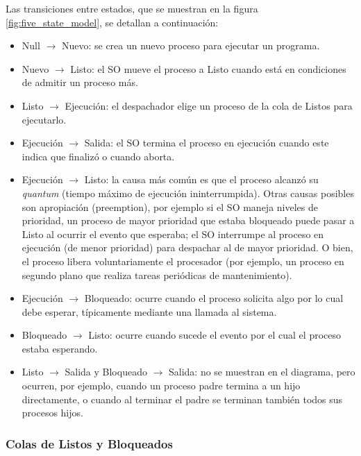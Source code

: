 Las transiciones entre estados, que se muestran en la figura \ref{fig:five_state_model}, se detallan a continuación:
\begin{itemize}
  \item Null \(\to\) Nuevo: se crea un nuevo proceso para ejecutar un programa.

  \item Nuevo \(\to\) Listo: el SO mueve el proceso a Listo cuando está en condiciones de admitir un proceso más.

  \item Listo \(\to\) Ejecución: el despachador elige un proceso de la cola de Listos para ejecutarlo.

  \item Ejecución \(\to\) Salida: el SO termina el proceso en ejecución cuando este indica que finalizó o cuando aborta.

  \item Ejecución \(\to\) Listo: la causa más común es que el proceso alcanzó su \emph{quantum} (tiempo máximo de ejecución ininterrumpida). Otras causas posibles son apropiación (preemption), por ejemplo si el SO maneja niveles de prioridad, un proceso de mayor prioridad que estaba bloqueado puede pasar a Listo al ocurrir el evento que esperaba; el SO interrumpe al proceso en ejecución (de menor prioridad) para despachar al de mayor prioridad. O bien, el proceso libera voluntariamente el procesador (por ejemplo, un proceso en segundo plano que realiza tareas periódicas de mantenimiento).

  \item Ejecución \(\to\) Bloqueado: ocurre cuando el proceso solicita algo por lo cual debe esperar, típicamente mediante una llamada al sistema.

  \item Bloqueado \(\to\) Listo: ocurre cuando sucede el evento por el cual el proceso estaba esperando.

  \item Listo \(\to\) Salida y Bloqueado \(\to\) Salida: no se muestran en el diagrama, pero ocurren, por ejemplo, cuando un proceso padre termina a un hijo directamente, o cuando al terminar el padre se terminan también todos sus procesos hijos.
\end{itemize}

\subsubsection{Colas de Listos y Bloqueados}

